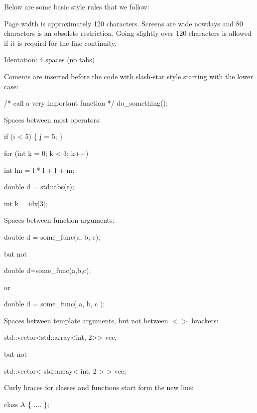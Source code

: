 Below are some basic style rules that we follow\+:
\begin{DoxyItemize}
\item Page width is approximately 120 characters. Screens are wide nowdays and 80 characters is an obsolete restriction. Going slightly over 120 characters is allowed if it is requird for the line continuity.
\item Identation\+: 4 spaces (no tabs)
\item Coments are inserted before the code with slash-\/star style starting with the lower case\+: 
\begin{DoxyCode}
\textcolor{comment}{/* call a very important function */}
do\_something();
\end{DoxyCode}

\item Spaces between most operators\+: 
\begin{DoxyCode}
\textcolor{keywordflow}{if} (i < 5) \{
    j = 5;
\}

\textcolor{keywordflow}{for} (\textcolor{keywordtype}{int} k = 0; k < 3; k++)

\textcolor{keywordtype}{int} lm = l * l + l + m;

\textcolor{keywordtype}{double} d = std::abs(e);

\textcolor{keywordtype}{int} k = idx[3];
\end{DoxyCode}

\item Spaces between function arguments\+: 
\begin{DoxyCode}
\textcolor{keywordtype}{double} d = some\_func(a, b, c);
\end{DoxyCode}
 but not 
\begin{DoxyCode}
\textcolor{keywordtype}{double} d=some\_func(a,b,c);
\end{DoxyCode}
 or 
\begin{DoxyCode}
\textcolor{keywordtype}{double} d = some\_func( a, b, c );
\end{DoxyCode}

\item Spaces between template arguments, but not between $<$$>$ brackets\+: 
\begin{DoxyCode}
std::vector<std::array<int, 2>> vec;
\end{DoxyCode}
 but not 
\begin{DoxyCode}
std::vector< std::array< int, 2 > > vec;
\end{DoxyCode}

\item Curly braces for classes and functions start form the new line\+: 
\begin{DoxyCode}
\textcolor{keyword}{class }A
\{
    ....
\};


\end{DoxyCode}
\end{DoxyItemize}
